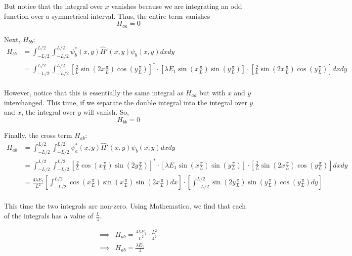\documentclass{article}
\begin{document}
But notice that the integral over $x$ vanishes because we are integrating an odd function over a symmetrical interval. Thus, the entire term vanishes
\[ \boxed{H_{aa} = 0} \]

\vskip 0.25cm
Next, $H_{bb}$:
\begin{align*}
  H_{bb} &= \int_{-L/2}^{L/2}  \int_{-L/2}^{L/2}  \psi_b^{*}(x, y) \hat{H}'(x, y) \psi_b(x, y) dx dy \\
  &= \int_{-L/2}^{L/2}  \int_{-L/2}^{L/2} \left[ \frac{2}{L} \sin\left(2 x \frac{\pi}{L}\right) \cos\left(y \frac{\pi}{L}\right)\right]^{*} \cdot \left[ \lambda E_1 \sin \left(x \frac{\pi}{L}\right) \sin \left( y \frac{\pi}{L} \right)  \right] \cdot \left[ \frac{2}{L} \sin\left(2 x \frac{\pi}{L}\right) \cos\left(y \frac{\pi}{L}\right) \right] dx dy \\
\end{align*}

However, notice that this is essentially the same integral as $H_{aa}$ but with $x$ and $y$ interchanged. This time, if we separate the double integral into the integral over $y$ and $x$, the integral over $y$ will vanish. So, 
\[ \boxed{H_{bb} = 0} \]

\vskip 0.25cm
Finally, the cross term $H_{ab}$:
\begin{align*}
  H_{ab} &= \int_{-L/2}^{L/2}  \int_{-L/2}^{L/2}  \psi_a^{*}(x, y) \hat{H}'(x, y) \psi_b(x, y) dx dy \\
  &= \int_{-L/2}^{L/2}  \int_{-L/2}^{L/2} \left[ \frac{2}{L} \cos\left(x \frac{\pi}{L}\right) \sin\left(2 y \frac{\pi}{L}\right) \right]^{*} \cdot \left[ \lambda E_1 \sin \left(x \frac{\pi}{L}\right) \sin \left( y \frac{\pi}{L} \right)  \right] \cdot \left[ \frac{2}{L} \sin\left(2 x \frac{\pi}{L}\right) \cos\left(y \frac{\pi}{L}\right) \right] dx dy \\
  &= \frac{4\lambda E_1}{L^2} \left[\int_{-L/2}^{L/2}  \cos\left( x \frac{\pi}{L} \right) \sin \left( x \frac{\pi}{L} \right) \sin \left( 2x \frac{\pi}{L} \right) dx\right] \cdot \left[\int_{-L/2}^{L/2} \sin\left(2y \frac{\pi}{L}\right) \sin\left(y \frac{\pi}{L}\right) \cos \left( y \frac{\pi}{L} \right) dy\right] \\
\end{align*}

This time the two integrals are non-zero. Using Mathematica, we find that each of the integrals has a value of $\frac{L}{4}$.

\begin{align*}
  \implies &H_{ab} = \frac{4 \lambda E_1}{L^2} \cdot \frac{L^2}{4^2} \\
  \implies & \boxed{H_{ab}= \frac{\lambda E_1}{4}}
\end{align*}
\end{document}
